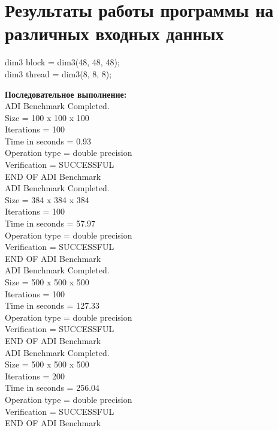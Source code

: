\documentclass[a4paper,12pt,titlepage,draft]{article}
\begin{document}
\section{Результаты работы программы на различных входных данных}
\begin{center}
    dim3 block = dim3(48, 48, 48);\\
    dim3 thread = dim3(8, 8, 8);\\
\end{center}
\begin{minipage}{.5\textwidth}
\textbf{Последовательное выполнение:}\\

 ADI Benchmark Completed.\\
 Size            =  100 x  100 x  100\\
 Iterations      =                100\\
 Time in seconds =               0.93\\
 Operation type  =   double precision\\
 Verification    =         SUCCESSFUL\\
 END OF ADI Benchmark\\
 
 ADI Benchmark Completed.\\
 Size            =  384 x  384 x  384\\
 Iterations      =                100\\
 Time in seconds =              57.97\\
 Operation type  =   double precision\\
 Verification    =         SUCCESSFUL\\
 END OF ADI Benchmark\\

 ADI Benchmark Completed.\\
 Size            =  500 x  500 x  500\\
 Iterations      =                100\\
 Time in seconds =             127.33\\
 Operation type  =   double precision\\
 Verification    =         SUCCESSFUL\\
 END OF ADI Benchmark\\

 ADI Benchmark Completed.\\
 Size            =  500 x  500 x  500\\
 Iterations      =                200\\
 Time in seconds =             256.04\\
 Operation type  =   double precision\\
 Verification    =         SUCCESSFUL\\
 END OF ADI Benchmark\\
 
\end{minipage}
\end{document}
